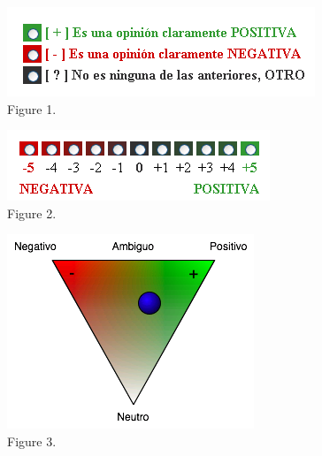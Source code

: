 \documentclass[11pt,letterpaper]{article}
\begin{document}
\begin{figure}
  \begin{center}
    \includegraphics[scale=0.6]
	{pics/Shot_HIT1.png}
	\caption{Figure 1.}
	\label{fig1}
  \end{center}
\end{figure}

\begin{figure}
  \begin{center}
    \includegraphics[scale=0.6]
	{pics/Shot_HIT2.png}
	\caption{Figure 2.}
	\label{fig2}
  \end{center}
\end{figure}

\begin{figure}
  \begin{center}
    \includegraphics[scale=0.6]
	{pics/Shot_HIT3.png}
	\caption{Figure 3.}
	\label{fig3}
  \end{center}
\end{figure}
\end{document}
